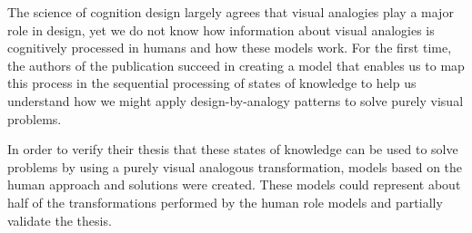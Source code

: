 \documentclass[12pt]{article}
\begin{document}
The science of cognition design largely agrees that visual analogies play a major role in design, yet we do not know how information about visual analogies is cognitively processed in humans and how these models work. For the first time, the authors of the publication succeed in creating a model that enables us to map this process in the sequential processing of states of knowledge to help us understand how we might apply design-by-analogy patterns to solve purely visual problems. 

In order to verify their thesis that these states of knowledge can be used to solve problems by using a purely visual analogous transformation, models based on the human approach and solutions were created. These models could represent about half of the transformations performed by the human role models and partially validate the thesis. 
\end{document}
